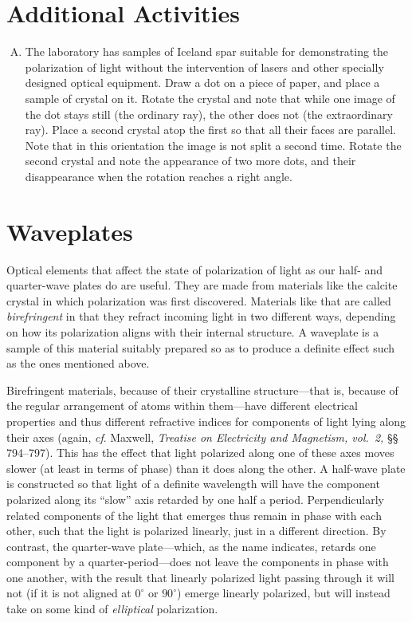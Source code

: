 \section*{Additional Activities}

\begin{enumerate}[(J)]

\item The laboratory has samples of Iceland spar suitable for demonstrating the polarization of light without the intervention of lasers and other specially designed optical equipment. Draw a dot on a piece of paper, and place a sample of crystal on it. Rotate the crystal and note that while one image of the dot stays still (the ordinary ray), the other does not (the extraordinary ray). Place a second crystal atop the first so that all their faces are parallel. Note that in this orientation the image is not split a second time. Rotate the second crystal and note the appearance of two more dots, and their disappearance when the rotation reaches a right angle.


\end{enumerate}


\section*{Waveplates}

Optical elements that affect the state of polarization of light as our half- and quarter-wave plates do are useful. They are made from materials like the calcite crystal in which polarization was first discovered. Materials like that are called \emph{birefringent} in that they refract incoming light in two different ways, depending on how its polarization aligns with their internal structure. A waveplate is a sample of this material suitably prepared so as to produce a definite effect such as the ones mentioned above.

Birefringent materials, because of their crystalline structure---that is, because of the regular arrangement of atoms within them---have different electrical properties and thus different refractive indices for components of light lying along their axes (again, \emph{cf}. Maxwell, \emph{Treatise on Electricity and Magnetism, vol.\ 2,} \S\S\,794--797). This has the effect that light polarized along one of these axes moves slower (at least in terms of phase) than it does along the other. A half-wave plate is constructed so that light of a definite wavelength will have the component polarized along its ``slow'' axis retarded by one half a period. Perpendicularly related components of the light that emerges thus remain in phase with each other, such that the light is polarized linearly, just in a different direction. By contrast, the quarter-wave plate---which, as the name indicates, retards one component by a quarter-period---does not leave the components in phase with one another, with the result that linearly polarized light passing through it will not (if it is not aligned at $0^\circ$ or $90^\circ$) emerge linearly polarized, but will instead take on some kind of \emph{elliptical} polarization.

